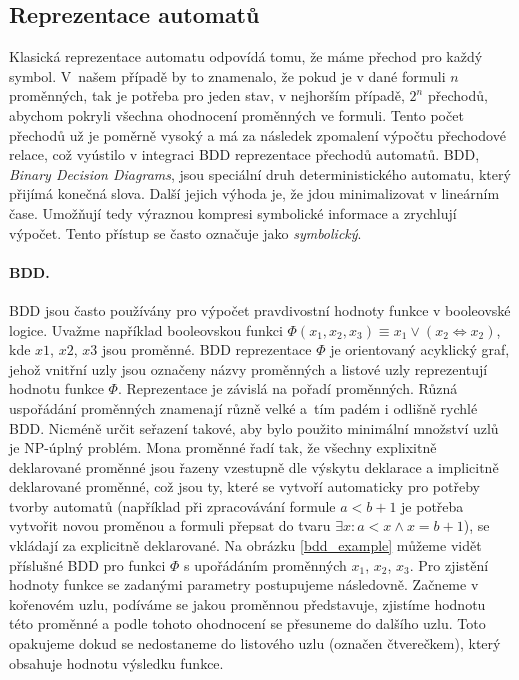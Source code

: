 \subsection{Reprezentace automatů}

\label{repr_aut}

Klasická reprezentace automatu odpovídá tomu, že máme přechod pro každý symbol. V~našem případě by to znamenalo, že pokud je v dané formuli $n$ proměnných, tak je potřeba pro jeden stav, v nejhorším případě, $2^n$ přechodů, abychom pokryli všechna ohodnocení proměnných ve formuli. Tento počet přechodů už je poměrně vysoký a má za následek zpomalení výpočtu přechodové relace, což vyústilo v integraci BDD reprezentace přechodů automatů. BDD, \textit{Binary Decision Diagrams}, jsou speciální druh deterministického automatu, který přijímá konečná slova. Další jejich výhoda je, že jdou minimalizovat v lineárním čase. Umožňují tedy výraznou kompresi symbolické informace a zrychlují výpočet. Tento přístup se často označuje jako \textit{symbolický}. 

\paragraph{BDD.} BDD jsou často používány pro výpočet pravdivostní hodnoty funkce v booleovské logice. Uvažme například booleovskou funkci $ \Phi (x_1,x_2,x_3) \equiv x_1 \vee (x_2 \Leftrightarrow x_2) $, kde $x1$, $x2$, $x3$ jsou proměnné. BDD reprezentace $\Phi$ je orientovaný acyklický graf, jehož vnitřní uzly jsou označeny názvy proměnných a listové uzly reprezentují hodnotu funkce $\Phi$. Reprezentace je závislá na pořadí proměnných. Různá uspořádání proměnných znamenají různě velké a~tím padém i odlišně rychlé BDD. Nicméně určit seřazení takové, aby bylo použito minimální množství uzlů je NP-úplný problém. Mona proměnné řadí tak, že všechny explixitně deklarované proměnné jsou řazeny vzestupně dle výskytu deklarace a implicitně deklarované proměnné, což jsou ty, které se vytvoří automaticky pro potřeby tvorby automatů (například při zpracovávání formule $a < b + 1$ je potřeba vytvořit novou proměnou a formuli přepsat do tvaru $ \exists x: a < x \wedge x = b + 1 $), se vkládají za explicitně deklarované. Na obrázku \ref{bdd_example} můžeme vidět příslušné BDD pro funkci $\Phi$ s upořádáním proměnných $x_1$, $x_2$, $x_3$. Pro zjistění hodnoty funkce se zadanými parametry postupujeme následovně. Začneme v kořenovém uzlu, podíváme se jakou proměnnou představuje, zjistíme hodnotu této proměnné a podle tohoto ohodnocení se přesuneme do dalšího uzlu. Toto opakujeme dokud se nedostaneme do listového uzlu (označen čtverečkem), který obsahuje hodnotu výsledku funkce.

